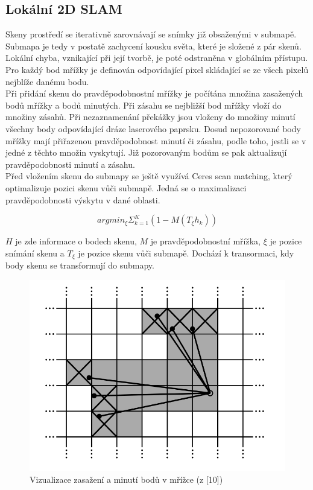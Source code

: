 \documentclass[12pt]{report}
\begin{document}
\subsection{Lokální 2D SLAM}
\indent Skeny prostředí se iterativně zarovnávají se snímky již obsaženými v submapě. Submapa je tedy v postatě zachycení kousku světa, které je složené z pár skenů. Lokální chyba, vznikající při její tvorbě, je poté odstraněna v globálním přístupu. Pro každý bod mřížky je definován odpovídající pixel skládající se ze všech pixelů nejblíže danému bodu.\\
\indent Při přidání skenu do pravděpodobnostní mřížky je počítána množina zasažených bodů mřížky a bodů minutých. Při zásahu se nejbližší bod mřížky vloží do množiny zásahů. Při nezaznamenání překážky jsou vloženy do množiny minutí všechny body odpovídající dráze laserového paprsku. Dosud nepozorované body mřížky mají přiřazenou pravděpodobnost minutí či zásahu, podle toho, jestli se v jedné z těchto množin vyskytují. Již pozorovaným bodům se pak aktualizují pravděpodobnosti minutí a zásahu.\\
\indent Před vložením skenu do submapy se ještě využívá Ceres scan matching, který optimalizuje pozici skenu vůči submapě. Jedná se o maximalizaci pravděpodobnosti výskytu v dané oblasti.  

\begin{equation}
argmin_\xi\Sigma^K_{k=1}(1-M(T_{\xi}h_k))
\end{equation}

$H$ je zde informace o bodech skenu, $M$ je pravděpodobnostní mřížka, $\xi$ je pozice snímání skenu a $T_{\xi}$ je pozice skenu vůči submapě. Dochází k transormaci, kdy body skenu se transformují do submapy.

\begin{figure}[!ht]
	\begin{center}
		\includegraphics[width=0.7\columnwidth]{imgs/cartographer.png}
	\end{center}
	\caption{Vizualizace zasažení a minutí bodů v mřížce (z [10])}
	\label{fig:cartographer}
\end{figure}
\end{document}
